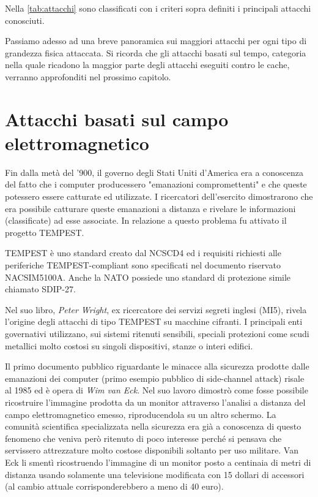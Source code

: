 			Nella \cref{tab:attacchi} sono classificati con i criteri sopra definiti i principali attacchi conosciuti.
			
			Passiamo adesso ad una breve panoramica sui maggiori attacchi per ogni tipo di grandezza fisica attaccata. Si ricorda che gli attacchi basati sul tempo, categoria nella quale ricadono la maggior parte degli attacchi eseguiti contro le cache, verranno approfonditi nel prossimo capitolo.
			
	\section{Attacchi basati sul campo elettromagnetico}
		Fin dalla metà del '900, il governo degli Stati Uniti d'America era a conoscenza del fatto che i computer producessero "emanazioni compromettenti" e che queste potessero essere catturate ed utilizzate. I ricercatori dell'esercito dimostrarono che era possibile catturare queste emanazioni a distanza e rivelare le informazioni (classificate) ad esse associate. In relazione a questo problema fu attivato il progetto \ac{TEMPEST}.
		
		TEMPEST è uno standard creato dal \ac{NCSCD4} ed i requisiti richiesti alle periferiche TEMPEST-compliant sono specificati nel documento riservato NACSIM5100A. Anche la \ac{NATO} possiede uno standard di protezione simile chiamato SDIP-27.
		
		Nel suo libro\cite{wright1987spycatcher}, \emph{Peter Wright}, ex ricercatore dei servizi segreti inglesi (MI5), rivela l'origine degli attacchi di tipo TEMPEST su macchine cifranti. I principali enti governativi utilizzano, sui sistemi ritenuti sensibili, speciali protezioni come scudi metallici molto costosi su singoli dispositivi, stanze o interi edifici\cite{herndon1990electromagnetic}.
		
		Il primo documento pubblico riguardante le minacce alla sicurezza prodotte dalle emanazioni dei computer (primo esempio pubblico di side-channel attack) risale al 1985 ed è opera di \emph{Wim van Eck}\cite{van1985electromagn}. Nel suo lavoro dimostrò come fosse possibile ricostruire l'immagine prodotta da un monitor attraverso l'analisi a distanza del campo elettromagnetico emesso, riproducendola su un altro schermo. La comunità scientifica specializzata nella sicurezza era già a conoscenza di questo fenomeno che veniva però ritenuto di poco interesse perché si pensava che servissero attrezzature molto costose disponibili soltanto per uso militare. Van Eck li smentì ricostruendo l'immagine di un monitor posto a centinaia di metri di distanza usando solamente una televisione modificata con 15 dollari di accessori (al cambio attuale corrisponderebbero a meno di 40 euro).
		
